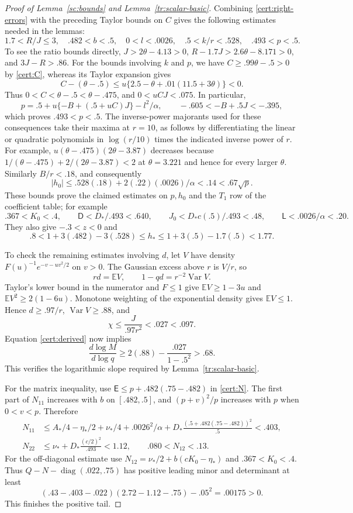\begin{proof}[Proof of Lemma~\ref{sc:bounds} and Lemma~\ref{tr:scalar-basic}]
Combining \eqref{cert:right-errors} with the preceding Taylor bounds
on $C$ gives the following estimates needed in the lemmas:
\begin{equation}\label{cert:right-consequences}
 1.7<R/J\le3,\quad .482<b<.5,\quad 0<l<.0026,\quad
 .5<k/r<.528,\quad .493<p<.5.
\end{equation}
To see the ratio bounds directly, $J>2\theta-4.13>0$,
$R-1.7J>2.6\theta-8.171>0$, and $3J-R>.86$.
For the bounds involving $k$ and $p$, we have
$C\ge .99\theta-.5>0$ by \eqref{cert:C}, whereas its Taylor expansion gives
\[
 C-(\theta-.5)\le
 u\{2.5-\theta+.01(11.5+3\theta)\}<0.
\]
Thus $0<C<\theta-.5<\theta-.475$, and $0<uCJ<.075$. In particular,
\[
 p=.5+u\{-B+(.5+uC)J\}-l^2/\alpha,\qquad
 -.605<-B+.5J<-.395,
\]
which proves $.493<p<.5$. The inverse-power majorants used for these consequences take their maxima at $r=10$,
as follows by differentiating the linear or quadratic polynomials in
$\log(r/10)$ times the indicated inverse power of $r$. For example,
$u(\theta-.475)(2\theta-3.87)$ decreases because
$1/(\theta-.475)+2/(2\theta-3.87)<2$ at $\theta=3.221$ and hence
for every larger $\theta$. Similarly $B/r<.18$, and consequently
\[
 |h_0|\le .528(.18)+2(.22)(.0026)/\alpha<.14<.67\sqrt p.
\]
These bounds prove the claimed estimates on $p,h_0$ and the $T_1$ row
of the coefficient table; for example
\[
 .367<K_0<.4,\qquad \mathsf D<D_*/.493<.640,\qquad
 J_0<D_*c(.5)/.493<.48,\qquad \mathsf L<.0026/\alpha<.20.
\]
They also give $-.3<z<0$ and
\[
 .8<1+3(.482)-3(.528)\le h_*
       \le1+3(.5)-1.7(.5)<1.77.
\]

To check the remaining estimates involving $d$, let $V$ have density
$F(u)^{-1}e^{-v-uv^2/2}$ on $v>0$. The Gaussian excess above $r$
is $V/r$, so
\[
 rd=\mathbb EV,\qquad 1-qd=r^{-2}\operatorname{Var}V.
\]
Taylor's lower bound in the numerator and $F\le1$ give
$\mathbb EV\ge1-3u$ and $\mathbb EV^2\ge2(1-6u)$.
Monotone weighting of the exponential density gives
$\mathbb EV\le1$. Hence $d\ge.97/r$,
$\operatorname{Var}V\ge.88$, and
\[
 \chi\le\frac{J}{.97r^2}<.027<.097.
\]
Equation \eqref{cert:derived} now implies
\[
 \frac{d\log M}{d\log q}
 \ge2(.88)-\frac{.027}{1-.5^2}>.68.
\]
This verifies the logarithmic slope required by Lemma~\ref{tr:scalar-basic}.

For the matrix inequality, use $\mathsf E\le p+.482(.75-.482)$
in \eqref{cert:N}. The first part of $N_{11}$ increases with $b$
on $[.482,.5]$, and $(p+v)^2/p$ increases with $p$ when
$0<v<p$. Therefore
\[
 \begin{split}
 N_{11}&\le A_*/4-\eta_*/2+\nu_*/4+.0026^2/\alpha
       +D_*\frac{(.5+.482(.75-.482))^2}{.5}<.403,\\
 N_{22}&\le\nu_*+D_*\frac{(c/2)^2}{.493}<1.12,
 \qquad .080<N_{12}<.13.
 \end{split}
\]
For the off-diagonal estimate use
$N_{12}=\nu_*/2+b(cK_0-\eta_*)$ and $.367<K_0<.4$.
Thus $Q-N-\operatorname{diag}(.022,.75)$ has positive leading minor
and determinant at least
\[
 (.43-.403-.022)(2.72-1.12-.75)-.05^2=.00175>0.
\]
This finishes the positive tail.


\end{proof}
